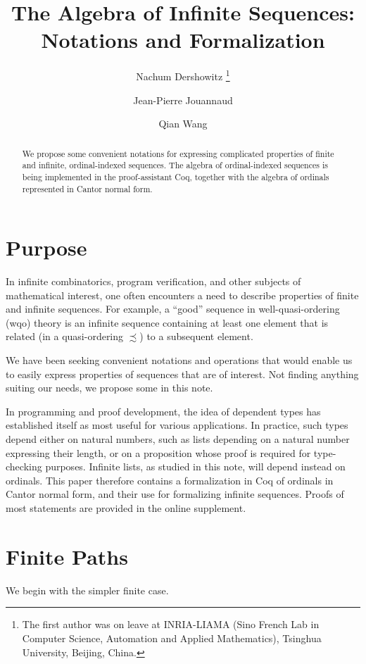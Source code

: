 \documentclass{llncs}
\title{The Algebra of Infinite Sequences:\\ Notations and Formalization}
\author{Nachum Dershowitz\inst{1}%
\thanks{The first author was on leave at INRIA-LIAMA
             (Sino French Lab in Computer Science, Automation
             and Applied Mathematics), Tsinghua University, Beijing, China.}
\and Jean-Pierre Jouannaud\inst{2,3}
\and Qian Wang\inst{2}}
\institute{School of Computer Science, Tel Aviv University, Ramat Aviv, Israel 
\and
School of Software, Tsinghua University, Beijing, China
\and
LIX, \'Ecole Polytechnique, Palaiseau, France}
\begin{document}
\maketitle

\begin{abstract}
We propose some convenient notations for expressing complicated
properties of finite and infinite, ordinal-indexed sequences. The
algebra of ordinal-indexed sequences is being implemented in the
proof-assistant Coq, together with the algebra of ordinals represented
in Cantor normal form.
\end{abstract}

\section{Purpose}

In infinite combinatorics, program verification, and other subjects of
mathematical interest, one often encounters a need to describe
properties of finite and infinite sequences.  For example, a ``good''
sequence in well-quasi-ordering (wqo) theory is an infinite sequence
containing at least one element that is related (in a quasi-ordering
$\precsim$) to a subsequent element.

We have been seeking convenient notations and operations that would
enable us to easily express properties of sequences that are of
interest.  Not finding anything suiting our needs, we propose some in
this note. 

In programming and proof development, the idea of dependent types
has established itself as most useful for various applications. In
practice, such types depend either on natural numbers, such as lists
depending on a natural number expressing their length, or on a
proposition whose proof is required for type-checking
purposes. Infinite lists, as studied in this note, will depend instead
on ordinals. This paper therefore contains a formalization in Coq of
ordinals in Cantor normal form, and their use for formalizing infinite
sequences. 
Proofs of most statements are provided in the online supplement.

\section{Finite Paths}

We begin with the simpler finite case.

\end{document}

